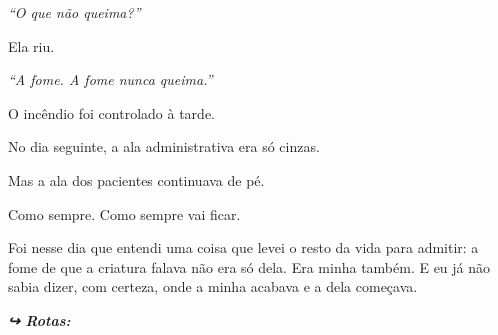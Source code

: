 \noindent \textit{\textquotedblleft{}O que não queima?\textquotedblright{}}

\noindent Ela riu.

\noindent \textit{\textquotedblleft{}A fome. A fome nunca queima.\textquotedblright{}}

\noindent O incêndio foi controlado à tarde.

\noindent No dia seguinte, a ala administrativa era só cinzas.

\noindent Mas a ala dos pacientes continuava de pé.

\noindent Como sempre.
Como sempre vai ficar.

\noindent Foi nesse dia que entendi uma coisa que levei o resto da vida para admitir: a fome de que a criatura falava não era só dela. Era minha também. E eu já não sabia dizer, com certeza, onde a minha acabava e a dela começava.

\vspace{0.5em}
\noindent\textit{\textbf{↪ Rotas:}  \rotasep {}}